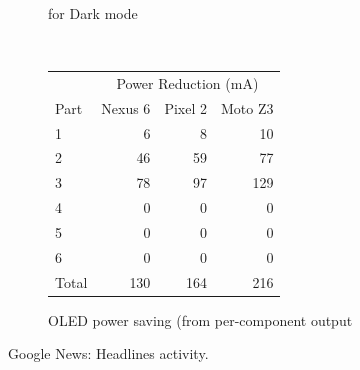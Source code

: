 \begin{figure}[th]
\begin{subfigure}[]{\columnwidth}
		\caption{\appwithlink for Dark mode}
	\end{subfigure}
	\\
	\begin{subfigure}[]{\columnwidth}
	\centering
	{ \small
	\begin{tabular}{ | l | r | r | r | }
		\hline
		     & \multicolumn{3}{|c|}{Power Reduction (mA)}\\
		\cline{2-4}
                Part & Nexus 6 & Pixel 2 & Moto Z3 \\
		\hline
		1 &   6  &   8 &   10  \\
		2 &  46  &  59 &   77  \\
		3 &  78  &  97 &  129  \\
		4 &   0  &   0 &    0  \\
		5 &   0  &   0 &    0  \\
		6 &   0  &   0 &    0  \\
		\hline
		Total   & 130 & 164 & 216  \\
		\hline
	\end{tabular}
	}
	\caption{OLED power saving (from \appwithlink per-component output}		
        \vspace{-0.1in}
	\end{subfigure}
	\caption{Google News: Headlines activity.}
        \vspace{-0.20in}
	\label{fig:case_study_news}
\end{figure}

